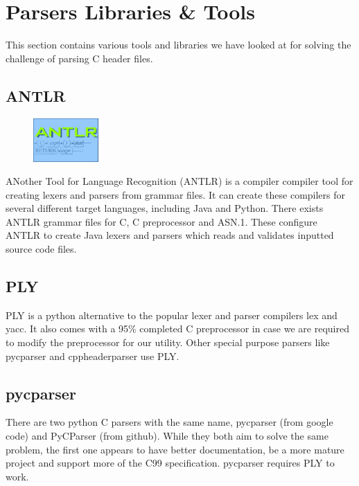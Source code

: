 \section{Parsers Libraries \& Tools}
\label{sec:pre:parsers}
This section contains various tools and libraries we have looked at for solving
the challenge of parsing C header files. 

\subsection{ANTLR}
\begin{figure}
	\begin{center}
	\vspace{-30pt}
		\includegraphics[width=2.5cm]{./planning/img/antlr_logo}
	\vspace{-30pt}
	\end{center}
\end{figure}
ANother Tool for Language Recognition (ANTLR) is a compiler compiler tool for
creating lexers and parsers from grammar files. It can create these compilers
for several different target languages, including Java and Python. There exists
ANTLR grammar files for C, C preprocessor and ASN.1. These configure ANTLR to
create Java lexers and parsers which reads and validates inputted source code
files.

\subsection{PLY}
PLY is a python alternative to the popular lexer and parser compilers lex and
yacc. It also comes with a 95\% completed C preprocessor in case we are
required to modify the preprocessor for our utility. Other special purpose
parsers like pycparser and cppheaderparser use PLY.

\subsection{pycparser}
There are two python C parsers with the same name, pycparser (from google code)
and PyCParser (from github). While they both aim to solve the same problem, the
first one appears to have better documentation, be a more mature project and
support more of the C99 specification. pycparser requires PLY to work.

